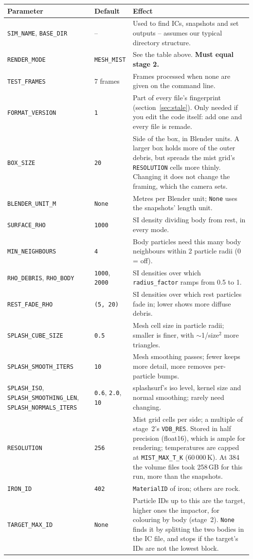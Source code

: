 \documentclass[11pt]{article}
\newcommand{\pc}[1]{\texttt{#1}}
\begin{document}
{\small
\begin{longtable}{@{}P{4.3cm} P{2.0cm} P{8.2cm}@{}}
\hline
\textbf{Parameter} & \textbf{Default} & \textbf{Effect} \\
\hline
\endhead
\pc{SIM\_NAME}, \pc{BASE\_DIR} & -- & Used to find ICs, snapshots and set outputs -- assumes our typical directory structure. \\
\pc{RENDER\_MODE} & \pc{MESH\_MIST} & See the table above. \textbf{Must equal stage 2.} \\
\pc{TEST\_FRAMES} & 7 frames & Frames processed when none are given on the command line. \\
\pc{FORMAT\_VERSION} & \pc{1} & Part of every file's fingerprint (section~\ref{sec:stale}). Only needed if you edit the code itself: add one and every file is remade. \\
\pc{BOX\_SIZE} & \pc{20} & Side of the box, in Blender units. A larger box holds more of the outer debris, but spreads the mist grid's \pc{RESOLUTION} cells more thinly. Changing it does not change the framing, which the camera sets. \\
\pc{BLENDER\_UNIT\_M} & \pc{None} & Metres per Blender unit; \pc{None} uses the snapshots' length unit. \\
\pc{SURFACE\_RHO} & \pc{1000} & SI density dividing body from rest, in every mode. \\
\pc{MIN\_NEIGHBOURS} & \pc{4} & Body particles need this many body neighbours within 2 particle radii (0 = off). \\
\pc{RHO\_DEBRIS}, \pc{RHO\_BODY} & \pc{1000}, \pc{2000} & SI densities over which \pc{radius\_factor} ramps from 0.5 to 1. \\
\pc{REST\_FADE\_RHO} & \pc{(5, 20)} & SI densities over which rest particles fade in; lower shows more diffuse debris. \\
\pc{SPLASH\_CUBE\_SIZE} & \pc{0.5} & Mesh cell size in particle radii; smaller is finer, with $\sim$1/size$^2$ more triangles. \\
\pc{SPLASH\_SMOOTH\_ITERS} & \pc{10} & Mesh smoothing passes; fewer keeps more detail, more removes per-particle bumps. \\
\pc{SPLASH\_ISO}, \pc{SPLASH\_SMOOTHING\_LEN}, \pc{SPLASH\_NORMALS\_ITERS} & \pc{0.6}, \pc{2.0}, \pc{10} & splashsurf's iso level, kernel size and normal smoothing; rarely need changing. \\
\pc{RESOLUTION} & \pc{256} & Mist grid cells per side; a multiple of stage~2's \pc{VDB\_RES}. Stored in half precision (float16), which is ample for rendering; temperatures are capped at \pc{MIST\_MAX\_T\_K} (60\,000\,K). At 384 the volume files took 258\,GB for this run, more than the snapshots. \\
\pc{IRON\_ID} & \pc{402} & \pc{MaterialID} of iron; others are rock. \\
\pc{TARGET\_MAX\_ID} & \pc{None} & Particle IDs up to this are the target, higher ones the impactor, for colouring by body (stage~2). \pc{None} finds it by splitting the two bodies in the IC file, and stops if the target's IDs are not the lowest block. \\
\hline
\end{longtable}
}
 
\end{document}
